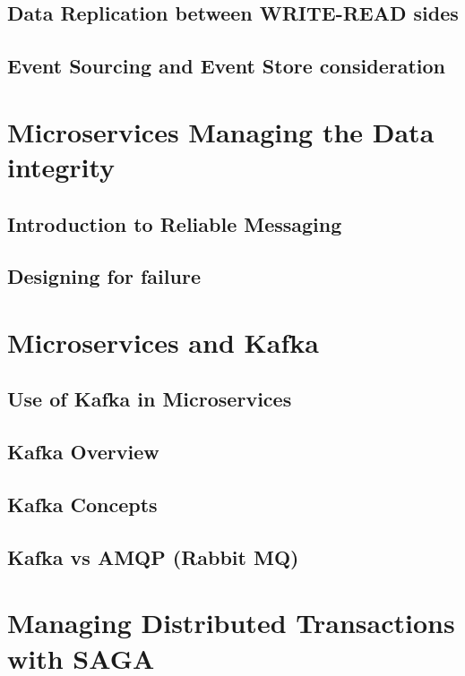 \documentclass[a4paper, 11pt]{book}
\begin{document}
    \section{Data Replication between WRITE-READ sides}


    \section{Event Sourcing and Event Store consideration}


    \chapter{Microservices Managing the Data integrity}


    \section{Introduction to Reliable Messaging}


    \section{Designing for failure}


    \chapter{Microservices and Kafka}


    \section{Use of Kafka in Microservices}


    \section{Kafka Overview}


    \section{Kafka Concepts}


    \section{Kafka vs AMQP (Rabbit MQ)}


    \chapter{Managing Distributed Transactions with SAGA}
\end{document}
